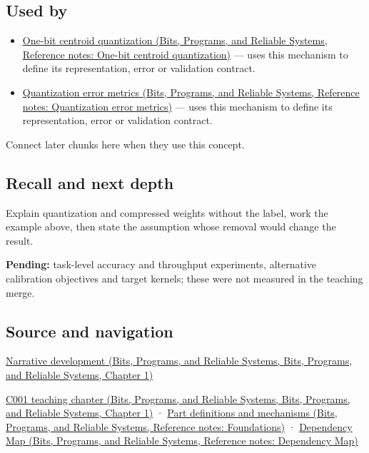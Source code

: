 \subsection{Used by}\label{appendix-fdc7879e8bf2-used-by}

\begin{itemize}
\tightlist
\item
  \href{../01-Bits-Programs-and-Reliable-Systems/main.pdf\#nameddest=appendix-4ccd7a775813}{One-bit centroid quantization (Bits, Programs, and Reliable Systems, Reference notes: One-bit centroid quantization)} --- uses this mechanism to define its representation, error or validation contract.
\item
  \href{../01-Bits-Programs-and-Reliable-Systems/main.pdf\#nameddest=appendix-537171d69d27}{Quantization error metrics (Bits, Programs, and Reliable Systems, Reference notes: Quantization error metrics)} --- uses this mechanism to define its representation, error or validation contract.
\end{itemize}

Connect later chunks here when they use this concept.

\subsection{Recall and next depth}\label{appendix-fdc7879e8bf2-recall-and-next-depth}

Explain quantization and compressed weights without the label, work the example above, then state the assumption whose removal would change the result.

\textbf{Pending:} task-level accuracy and throughput experiments, alternative calibration objectives and target kernels; these were not measured in the teaching merge.

\subsection{Source and navigation}\label{appendix-fdc7879e8bf2-source-and-navigation}

\href{../01-Bits-Programs-and-Reliable-Systems/main.pdf\#nameddest=01-foundations-i-ch001-choosing-what-information-to-keep}{Narrative development (Bits, Programs, and Reliable Systems, Bits, Programs, and Reliable Systems, Chapter 1)}

\href{../01-Bits-Programs-and-Reliable-Systems/main.pdf\#nameddest=01-foundations-i-ch001-from-a-signal-to-an-interpretation}{C001 teaching chapter (Bits, Programs, and Reliable Systems, Bits, Programs, and Reliable Systems, Chapter 1)} · \href{../01-Bits-Programs-and-Reliable-Systems/main.pdf\#nameddest=appendix-fd090d982a15}{Part definitions and mechanisms (Bits, Programs, and Reliable Systems, Reference notes: Foundations)} · \href{../01-Bits-Programs-and-Reliable-Systems/main.pdf\#nameddest=appendix-4ad47bdd269a}{Dependency Map (Bits, Programs, and Reliable Systems, Reference notes: Dependency Map)}
